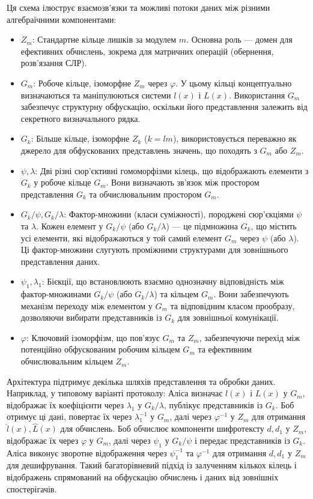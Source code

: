 Ця схема ілюструє взаємозв'язки та можливі потоки даних між різними алгебраїчними компонентами:
\begin{itemize}
    \item \textbf{$Z_m$}: Стандартне кільце лишків за модулем $m$. Основна роль — домен для ефективних обчислень, зокрема для матричних операцій (обернення, розв'язання СЛР).
    \item \textbf{$G_m$}: Робоче кільце, ізоморфне $Z_m$ через $\varphi$. У цьому кільці концептуально визначаються та маніпулюються системи $l(x)$ і $L(x)$. Використання $G_m$ забезпечує структурну обфускацію, оскільки його представлення залежить від секретного визначального рядка.
    \item \textbf{$G_k$}: Більше кільце, ізоморфне $Z_k$ ($k=lm$), використовується переважно як джерело для обфускованих представлень значень, що походять з $G_m$ або $Z_m$.
    \item \textbf{$\psi, \lambda$}: Дві різні сюр'єктивні гомоморфізми кілець, що відображають елементи з $G_k$ у робоче кільце $G_m$. Вони визначають зв'язок між простором представлення $G_k$ та обчислювальним простором $G_m$.
    \item \textbf{$G_k/\psi, G_k/\lambda$}: Фактор-множини (класи суміжності), породжені сюр'єкціями $\psi$ та $\lambda$. Кожен елемент у $G_k/\psi$ (або $G_k/\lambda$) — це підмножина $G_k$, що містить усі елементи, які відображаються у той самий елемент $G_m$ через $\psi$ (або $\lambda$). Ці фактор-множини слугують проміжними структурами для зовнішнього представлення даних.
    \item \textbf{$\psi_1, \lambda_1$}: Бієкції, що встановлюють взаємно однозначну відповідність між фактор-множинами $G_k/\psi$ (або $G_k/\lambda$) та кільцем $G_m$. Вони забезпечують механізм переходу між елементом у $G_m$ та відповідним класом прообразу, дозволяючи вибирати представників із $G_k$ для зовнішньої комунікації.
    \item \textbf{$\varphi$}: Ключовий ізоморфізм, що пов'язує $G_m$ та $Z_m$, забезпечуючи перехід між потенційно обфускованим робочим кільцем $G_m$ та ефективним обчислювальним кільцем $Z_m$.
\end{itemize}
Архітектура підтримує декілька шляхів представлення та обробки даних. Наприклад, у типовому варіанті протоколу: Аліса визначає $l(x)$ і $L(x)$ у $G_m$, відображає їх коефіцієнти через $\lambda_1$ у $G_k/\lambda$, публікує представників із $G_k$. Боб отримує ці дані, повертає їх через $\lambda_1^{-1}$ у $G_m$, далі через $\varphi^{-1}$ у $Z_m$ для отримання $\hat{l}(x), \hat{L}(x)$ для обчислень. Боб обчислює компоненти шифротексту $d, d_1$ у $Z_m$, відображає їх через $\varphi$ у $G_m$, далі через $\psi_1$ у $G_k/\psi$ і передає представників із $G_k$. Аліса виконує зворотне відображення через $\psi_1^{-1}$ та $\varphi^{-1}$ для отримання $d, d_1$ у $Z_m$ для дешифрування. Такий багаторівневий підхід із залученням кількох кілець і відображень спрямований на обфускацію обчислень і даних від зовнішніх спостерігачів.

